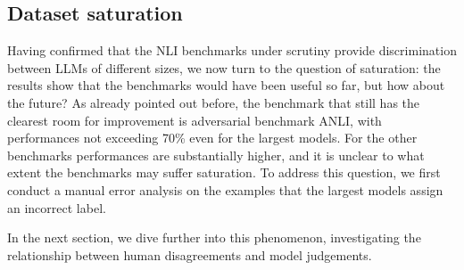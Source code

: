 \begin{table}
\centering
{}
\caption{Monotonicity values for the 8B and 70B models during the course of the training. We report both the discrete ($mon_{disc}$) and continuous ($mon_{cont}$) monotonicity values.}
\label{tab:monotonicity}
\end{table}

\subsection{Dataset saturation}\label{subsec:saturation}
Having confirmed that the NLI benchmarks under scrutiny provide discrimination between LLMs of different sizes, we now turn to the question of saturation: the results show that the benchmarks would have been useful so far, but how about the future?
As already pointed out before, the benchmark that still has the clearest room for improvement is adversarial benchmark ANLI, with performances not exceeding 70\% even for the largest models.
For the other benchmarks performances are substantially higher, and it is unclear to what extent the benchmarks may suffer saturation.
To address this question, we first conduct a manual error analysis on the examples that the largest models assign an incorrect label.

In the next section, we dive further into this phenomenon, investigating the relationship between human disagreements and model judgements.

